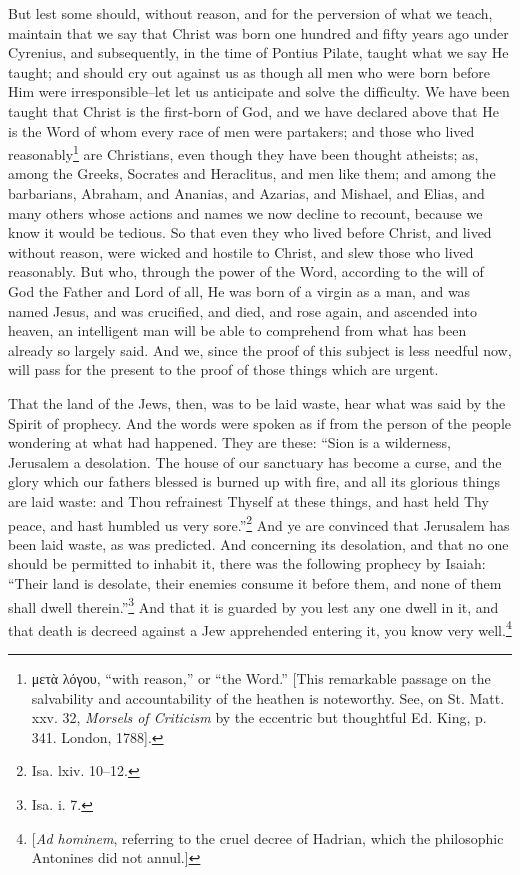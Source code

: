 But lest some should, without reason, and for the perversion of what we teach, maintain that we say that Christ was born one hundred and fifty years ago under Cyrenius, and subsequently, in the time of Pontius Pilate, taught what we say He taught; and should cry out against us as though all men who were born before Him were irresponsible--let let us anticipate and solve the difficulty. We have been taught that Christ is the first-born of God, and we have declared above that He is the Word of whom every race of men were partakers; and those who lived reasonably\footnote{\textgreek{μετὰ λόγου}, “with reason,” or “the Word.” [This remarkable passage on the salvability and accountability of the heathen is noteworthy. See, on St. Matt. xxv. 32, \emph{Morsels of Criticism} by the eccentric but thoughtful Ed. King, p. 341. London, 1788].} are Christians, even though they have been thought atheists; as, among the Greeks, Socrates and Heraclitus, and men like them; and among the barbarians, Abraham, and Ananias, and Azarias, and Mishael, and Elias, and many others whose actions and names we now decline to recount, because we know it would be tedious. So that even they who lived before Christ, and lived without reason, were wicked and hostile to Christ, and slew those who lived reasonably. But who, through the power of the Word, according to the will of God the Father and Lord of all, He was born of a virgin as a man, and was named Jesus, and was crucified, and died, and rose again, and ascended into heaven, an intelligent man will be able to comprehend from what has been already so largely said. And we, since the proof of this subject is less needful now, will pass for the present to the proof of those things which are urgent.


That the land of the Jews, then, was to be laid waste, hear what was said by the Spirit of prophecy. And the words were spoken as if from the person of the people wondering at what had happened. They are these: “Sion is a wilderness, Jerusalem a desolation. The house of our sanctuary has become a curse, and the glory which our fathers blessed is burned up with fire, and all its glorious things are laid waste: and Thou refrainest Thyself at these things, and hast held Thy peace, and hast humbled us very sore.”\footnote{Isa. lxiv. 10–12.} And ye are convinced that Jerusalem has been laid waste, as was predicted. And concerning its desolation, and that no one should be permitted to inhabit it, there was the following prophecy by Isaiah: “Their land is desolate, their enemies consume it before them, and none of them shall dwell therein.”\footnote{Isa. i. 7.} And that it is guarded by you lest any one dwell in it, and that death is decreed against a Jew apprehended entering it, you know very well.\footnote{[\emph{Ad hominem}, referring to the cruel decree of Hadrian, which the philosophic Antonines did not annul.]}

